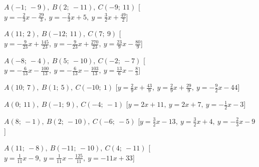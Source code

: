 \begin{esercizio}
\begin{enumeratea}
  \item  $A(-1;~-9),~B(2;~-11),~C(-9;~11)$ \hfill 
   [$y = -\frac{2}{3} x -\frac{29}{3},~y = -\frac{2}{3} x +5,~y = \frac{3}{2} x +\frac{49}{2}$]
  \item  $A(11;~2),~B(-12;~11),~C(7;~9)$ \hfill 
   [$y = -\frac{9}{23} x +\frac{145}{23},~y = -\frac{9}{23} x +\frac{270}{23},~y = \frac{23}{9} x -\frac{80}{9}$]
  \item  $A(-8;~-4),~B(5;~-10),~C(-2;~-7)$ \hfill 
   [$y = -\frac{6}{13} x -\frac{100}{13},~y = -\frac{6}{13} x -\frac{103}{13},~y = \frac{13}{6} x -\frac{8}{3}$]
  \item  $A(10;~7),~B(1;~5),~C(-10;~1)$ \hfill 
   [$y = \frac{2}{9} x +\frac{43}{9},~y = \frac{2}{9} x +\frac{29}{9},~y = -\frac{9}{2} x -44$]
  \item  $A(0;~11),~B(-1;~9),~C(-4;~-1)$ \hfill 
   [$y = 2 x +11,~y = 2 x +7,~y = -\frac{1}{2} x -3$]
  \item  $A(8;~-1),~B(2;~-10),~C(-6;~-5)$ \hfill 
   [$y = \frac{3}{2} x -13,~y = \frac{3}{2} x +4,~y = -\frac{2}{3} x -9$]
  \item  $A(11;~-8),~B(-11;~-10),~C(4;~-11)$ \hfill 
   [$y = \frac{1}{11} x -9,~y = \frac{1}{11} x -\frac{125}{11},~y = -11 x +33$]
 \end{enumeratea}
\end{esercizio}

\subsubsection*{}

